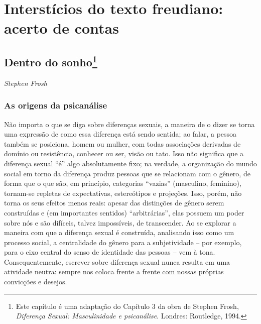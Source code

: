 \part{Interstícios do texto freudiano:\\ acerto de contas}

\chapter*{Dentro do sonho\footnote{Este capítulo é uma adaptação do
  Capítulo 3 da obra de Stephen Frosh, \emph{Diferença Sexual:
  Masculinidade e psicanálise}. Londres: Routledge, 1994.}}


\begin{flushright}
\emph{Stephen Frosh}
\end{flushright}

\section{As origens da psicanálise}

Não importa o que se diga sobre diferenças sexuais, a maneira de o dizer
se torna uma expressão de como essa diferença está sendo sentida; ao
falar, a pessoa também se posiciona, homem ou mulher, com todas
associações derivadas de domínio ou resistência, conhecer ou ser, visão
ou tato. Isso não significa que a diferença sexual ``é'' algo
absolutamente fixo; na verdade, a organização do mundo social em torno
da diferença produz pessoas que se relacionam com o gênero, de forma que
o que são, em princípio, categorias ``vazias'' (masculino, feminino),
tornam-se repletas de expectativas, estereótipos e projeções. Isso,
porém, não torna os seus efeitos menos reais: apesar das distinções de
gênero serem construídas e (em importantes sentidos) ``arbitrárias'',
elas possuem um poder sobre nós e são difíceis, talvez impossíveis, de
transcender. Ao se explorar a maneira com que a diferença sexual é
construída, analisando isso como um processo social, a centralidade do
gênero para a subjetividade -- por exemplo, para o eixo central do senso
de identidade das pessoas -- vem à tona. Consequentemente, escrever
sobre diferença sexual nunca resulta em uma atividade neutra: sempre nos
coloca frente a frente com nossas próprias convicções e desejos.

